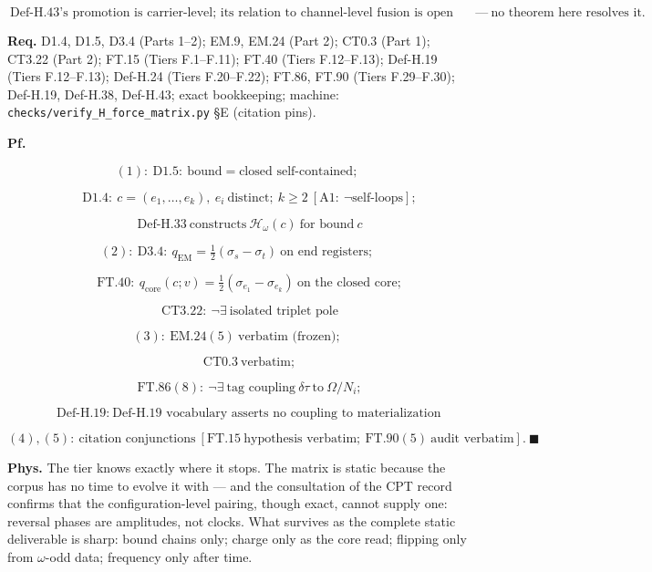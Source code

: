 \begin{theorem}
\[
\ \text{Def-H.43's promotion is carrier-level; its relation to channel-level fusion is open bridge content}\ \ —\ \text{no theorem here resolves it}.
\]

\textbf{Req.} D1.4, D1.5, D3.4 (Parts 1–2); EM.9, EM.24 (Part 2); CT0.3 (Part 1); CT3.22 (Part 2); FT.15 (Tiers F.1–F.11); FT.40 (Tiers F.12–F.13); Def-H.19 (Tiers F.12–F.13); Def-H.24 (Tiers F.20–F.22); FT.86, FT.90 (Tiers F.29–F.30); Def-H.19, Def-H.38, Def-H.43; exact bookkeeping; machine: \texttt{checks/\allowbreak{}verify\_\allowbreak{}H\_\allowbreak{}force\_\allowbreak{}matrix.py} §E (citation pins).

\textbf{Pf.}

\[
(1):\ \mathrm{D1.5}:\ \text{bound}=\text{closed self-contained};
\]

\[
\qquad \mathrm{D1.4}:\ c=(e_1,\dots,e_k),\ e_i\ \text{distinct};\ k\ge2\ [\mathrm{A1}:\ \neg\text{self-loops}];
\]

\[
\qquad \mathrm{Def\text{-}H.33}\ \text{constructs}\ \mathcal H_\omega(c)\ \text{for bound}\ c
\]

\[
(2):\ \mathrm{D3.4}:\ q_{\mathrm{EM}}=\tfrac12(\sigma_s-\sigma_t)\ \text{on end registers};
\]

\[
\qquad \mathrm{FT.40}:\ q_{\mathrm{core}}(c;v)=\tfrac12(\sigma_{e_1}-\sigma_{e_k})\ \text{on the closed core};
\]

\[
\qquad \mathrm{CT3.22}:\ \neg\exists\ \text{isolated triplet pole}
\]

\[
(3):\ \mathrm{EM.24}(5)\ \text{verbatim (frozen)};
\]

\[
\qquad \mathrm{CT0.3}\ \text{verbatim};
\]

\[
\qquad \mathrm{FT.86}(8):\ \neg\exists\ \text{tag coupling}\ \delta\tau\ \text{to}\ \Omega/N_i;
\]

\[
\qquad \text{Def-H.19}:\ \text{Def-H.19 vocabulary asserts no coupling to materialization}
\]

\[
(4),(5):\ \text{citation conjunctions}\ [\mathrm{FT.15}\ \text{hypothesis verbatim};\ \mathrm{FT.90}(5)\ \text{audit verbatim}].\ \blacksquare
\]

\textbf{Phys.} The tier knows exactly where it stops. The matrix is static because the corpus has no time to evolve it with — and the consultation of the CPT record confirms that the configuration-level pairing, though exact, cannot supply one: reversal phases are amplitudes, not clocks. What survives as the complete static deliverable is sharp: bound chains only; charge only as the core read; flipping only from $\omega$-odd data; frequency only after time.


\end{theorem}
